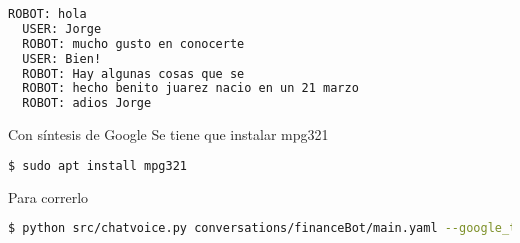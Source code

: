 \documentclass{article}
\begin{document}
\begin{lstlisting}[frame=single,language=bash,caption=Resultado]
  ROBOT: hola
  USER: Jorge
  ROBOT: mucho gusto en conocerte
  USER: Bien!
  ROBOT: Hay algunas cosas que se
  ROBOT: hecho benito juarez nacio en un 21 marzo
  ROBOT: adios Jorge
\end{lstlisting}

Con síntesis de Google
Se tiene que instalar mpg321

\begin{lstlisting}[language=bash,caption=Correr chatbot]
  $ sudo apt install mpg321
\end{lstlisting}

Para correrlo
\begin{lstlisting}[language=bash,caption=Correr chatbot]
  $ python src/chatvoice.py conversations/financeBot/main.yaml --google_tts
\end{lstlisting}
\end{document}
